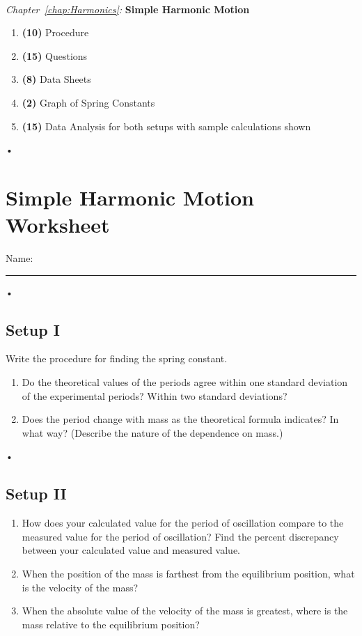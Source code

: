 \documentclass[main.tex]{subfiles}
\begin{document}
\begin{samepage}
\hrulefill \\
\emph{Chapter~\ref{chap:Harmonics}:} \textbf{Simple Harmonic Motion}
\begin{enumerate}
\item
\textbf{(10)} Procedure
\item
\textbf{(15)} Questions
\item
\textbf{(8)} Data Sheets
\item
\textbf{(2)} Graph of Spring Constants
\item
\textbf{(15)} Data Analysis for both setups with sample calculations shown
\end{enumerate}•
\end{samepage}

\newpage
\section{Simple Harmonic Motion Worksheet}
\begin{flushright}
Name:\rule[-1mm]{5cm}{.1pt}
\end{flushright}•

\subsection*{Setup I}


Write the procedure for finding the spring constant.
\\[10cm]

\begin{enumerate}
\item
Do the theoretical values of the periods agree within one standard deviation of the experimental periods? Within two standard deviations?
\\[2cm]

\item
Does the period change with mass as the theoretical formula indicates? In what way? (Describe the nature of the dependence on mass.)
\end{enumerate}•
\newpage

\subsection*{Setup II}

\begin{enumerate}
\item
How does your calculated value for the period of oscillation compare to the measured value for the period of oscillation? Find the percent discrepancy between your calculated value and measured value.
\\[3cm]

\item
When the position of the mass is farthest from the equilibrium position, what is the velocity of the mass?
\\[3cm]

\item
When the absolute value of the velocity of the mass is greatest, where is the mass relative to the equilibrium position?
\end{enumerate}
\newpage
\end{document}
